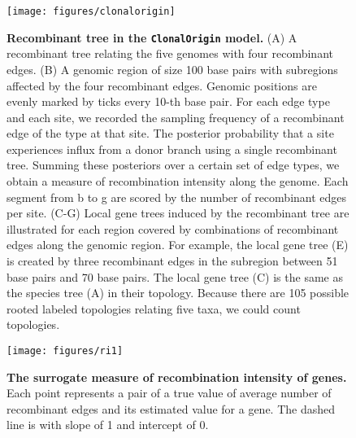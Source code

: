 \documentclass[10pt]{article}
\begin{document}
\begin{figure}[!ht]
\texttt{[image: figures/clonalorigin]}
\caption{
{\bf Recombinant tree in the \texttt{ClonalOrigin} model.}
(A) A recombinant tree relating the five genomes with four recombinant edges.
(B) A genomic region of size 100 base pairs with subregions affected by the
four recombinant edges. Genomic positions are evenly marked by ticks every 10-th
base pair.  For each edge type and each site, we recorded the sampling frequency
of a recombinant edge of the type at that site.  The posterior probability that
a site experiences influx from a donor branch using a single recombinant tree.
Summing these posteriors over a certain set of edge types, we obtain a measure
of recombination intensity along the genome.  Each segment from b to g are
scored by the number of recombinant edges per site.  (C-G) Local gene trees
induced by the recombinant tree are illustrated for each region covered by
combinations of recombinant edges along the genomic region. For example, the
local gene tree (E) is created by three recombinant edges in the subregion
between 51 base pairs and 70 base pairs. The local gene tree (C) is the same as
the species tree (A) in their topology.  Because there are 105 possible rooted
labeled topologies relating five taxa, we could count topologies.}
\label{fig:clonalorigin}
\end{figure}
\clearpage{}%

\begin{figure}[!ht]
\texttt{[image: figures/ri1]}
\caption{
{\bf The surrogate measure of recombination intensity
of genes.} Each point represents a pair of a true value of average number of
recombinant edges and its estimated value for a gene. The dashed line is with
slope of 1 and intercept of 0.}
\label{fig:ri1}
\end{figure}

\clearpage{}%


\end{document}
